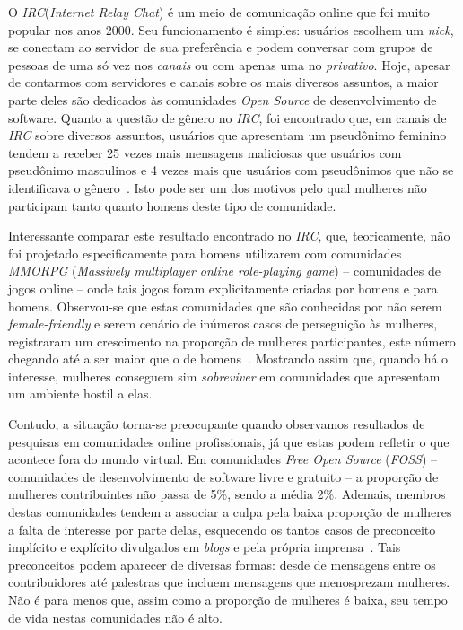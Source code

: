 O \emph{IRC}(\emph{Internet Relay Chat}) é um meio de comunicação online que foi muito popular nos anos 2000. Seu funcionamento é simples: usuários escolhem um \emph{nick}, se conectam ao servidor de sua preferência e podem conversar com grupos de pessoas de uma só vez nos \emph{canais} ou com apenas uma no \emph{privativo}. Hoje, apesar de contarmos com servidores e canais sobre os mais diversos assuntos, a maior parte deles são dedicados às comunidades \emph{Open Source} de desenvolvimento de software. Quanto a questão de gênero no \emph{IRC}, foi encontrado que, em canais de \emph{IRC} sobre diversos assuntos, usuários que apresentam um pseudônimo feminino tendem a receber 25 vezes mais mensagens maliciosas que usuários com pseudônimo masculinos e 4 vezes mais que usuários com pseudônimos que não se identificava o gênero~\cite{meyer2006assessing}. Isto pode ser um dos motivos pelo qual mulheres não participam tanto quanto homens deste tipo de comunidade. 

Interessante comparar este resultado encontrado no \emph{IRC}, que, teoricamente, não foi projetado especificamente para homens utilizarem com comunidades \emph{MMORPG} (\emph{Massively multiplayer online role-playing game}) -- comunidades de jogos online -- onde tais jogos foram explicitamente criadas por homens e para homens. Observou-se que estas comunidades que são conhecidas por não serem \textit{female-friendly} e serem cenário de inúmeros casos de perseguição às mulheres, registraram um crescimento na proporção de mulheres participantes, este número chegando até a ser maior que o de homens~\cite{taylor2003multiple}. Mostrando assim que, quando há o interesse, mulheres conseguem sim \emph{sobreviver} em comunidades que apresentam um ambiente hostil a elas.

Contudo, a situação torna-se preocupante quando observamos resultados de pesquisas em comunidades online profissionais, já que estas podem refletir o que acontece fora do mundo virtual. Em comunidades \textit{Free Open Source} (\emph{FOSS}) -- comunidades de desenvolvimento de software livre e gratuito -- a proporção de mulheres contribuintes não passa de 5\%, sendo a média 2\%. Ademais, membros destas comunidades tendem a associar a culpa pela baixa proporção de mulheres a falta de interesse por parte delas, esquecendo os tantos casos de preconceito implícito e explícito divulgados em \emph{blogs} e pela própria imprensa~\cite{rustad2011suck}. Tais preconceitos podem aparecer de diversas formas: desde de mensagens entre os contribuidores até palestras que incluem mensagens que menosprezam mulheres. Não é para menos que, assim como a proporção de mulheres é baixa, seu tempo de vida nestas comunidades não é alto.

